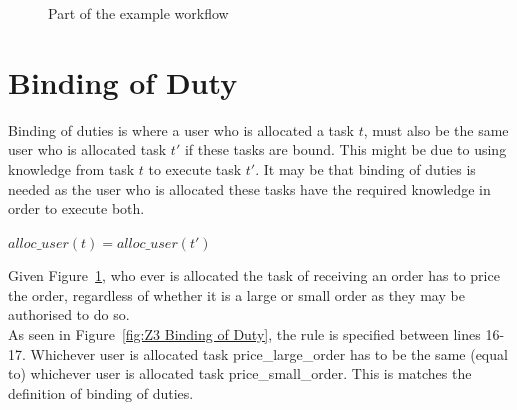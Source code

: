 \documentclass[a4paper]{report}
\begin{document}
\begin{figure}[!htb]
\centering
{}
\caption{Part of the example workflow}
\label{fig:Part of the example workflow}
\end{figure}

\section{Binding of Duty}
Binding of duties\cite{bod} is where a user who is allocated a task $t$, must also be the same user who is allocated task $t\ensuremath{'}$ if these tasks are bound. This might be due to using knowledge from task $t$ to execute task $t\ensuremath{'}$. It may be that binding of duties is needed as the user who is allocated these tasks have the required knowledge in order to execute both.\\
\begin{center}
$alloc\_user(t) = alloc\_user(t\ensuremath{'})$
\end{center}

Given Figure~\ref{fig:Part of the example workflow}, who ever is allocated the task of receiving an order has to price the order, regardless of whether it is a large or small order as they may be authorised to do so. \\

As seen in Figure~\ref{fig:Z3 Binding of Duty}, the rule is specified between lines 16-17. Whichever user is allocated task price\_large\_order has to be the same (equal to) whichever user is allocated task price\_small\_order. This is matches the definition of binding of duties.\\
\end{document}
